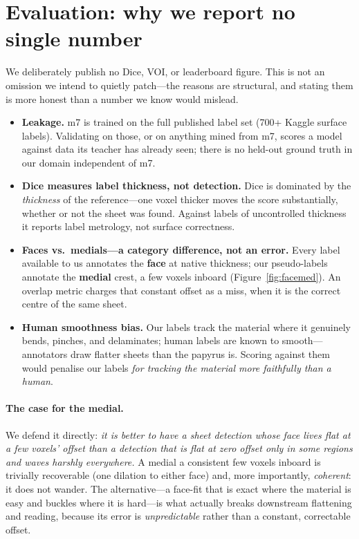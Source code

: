 \documentclass[10pt,twocolumn,a4paper]{article}
\begin{document}
\section{Evaluation: why we report no single number}\label{sec:eval}
We deliberately publish no Dice, VOI, or leaderboard figure. This is not an
omission we intend to quietly patch---the reasons are structural, and stating them
is more honest than a number we know would mislead.
\begin{itemize}[nosep]
  \item \textbf{Leakage.} m7 is trained on the full published label set (700+
  Kaggle surface labels). Validating on those, or on anything mined from m7,
  scores a model against data its teacher has already seen; there is no held-out
  ground truth in our domain independent of m7.
  \item \textbf{Dice measures label thickness, not detection.} Dice is dominated
  by the \emph{thickness} of the reference---one voxel thicker moves the score
  substantially, whether or not the sheet was found. Against labels of
  uncontrolled thickness it reports label metrology, not surface correctness.
  \item \textbf{Faces vs.\ medials---a category difference, not an error.} Every
  label available to us annotates the \textbf{face} at native thickness; our
  pseudo-labels annotate the \textbf{medial} crest, a few voxels inboard
  (Figure~\ref{fig:facemed}). An overlap metric charges that constant offset as a
  miss, when it is the correct centre of the same sheet.
  \item \textbf{Human smoothness bias.} Our labels track the material where it
  genuinely bends, pinches, and delaminates; human labels are known to
  smooth---annotators draw flatter sheets than the papyrus is. Scoring against them
  would penalise our labels \emph{for tracking the material more faithfully than a
  human}.
\end{itemize}

\paragraph{The case for the medial.} We defend it directly: \emph{it is better to
have a sheet detection whose face lives flat at a few voxels' offset than a
detection that is flat at zero offset only in some regions and waves harshly
everywhere.} A medial a consistent few voxels inboard is trivially recoverable
(one dilation to either face) and, more importantly, \emph{coherent}: it does not
wander. The alternative---a face-fit that is exact where the material is easy and
buckles where it is hard---is what actually breaks downstream flattening and
reading, because its error is \emph{unpredictable} rather than a constant,
correctable offset.
\end{document}
